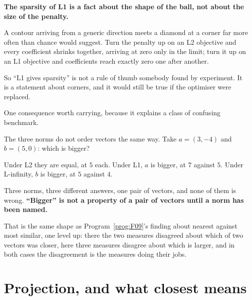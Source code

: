 \begin{fr}
\begin{trapbox}
\textbf{The sparsity of L1 is a fact about the shape of the ball, not about the
size of the penalty.}

A contour arriving from a generic direction meets a diamond at a corner far
more often than chance would suggest. Turn the penalty up on an L2 objective
and every coefficient shrinks together, arriving at zero only in the limit;
turn it up on an L1 objective and coefficients reach exactly zero one after
another.

So \enquote{L1 gives sparsity} is not a rule of thumb somebody found by
experiment. It is a statement about corners, and it would still be true if the
optimiser were replaced.
\end{trapbox}
\end{fr}

\begin{fr}
One consequence worth carrying, because it explains a class of confusing
benchmark.

The three norms do not order vectors the same way. Take $a = (3, -4)$ and
$b = (5, 0)$: which is bigger?
\dotline
\nextframe
\end{fr}

\begin{fr}
\begin{ansblock}
Under L2 they are equal, at $5$ each. Under L1, $a$ is bigger, at $7$ against
$5$. Under L-infinity, $b$ is bigger, at $5$ against $4$.
\end{ansblock}

Three norms, three different answers, one pair of vectors, and none of them is
wrong. \textbf{\enquote{Bigger} is not a property of a pair of vectors until a
norm has been named.}

That is the same shape as Program~\ref{prog:F09}'s finding about nearest
against most similar, one level up: there the two measures disagreed about
which of two vectors was closer, here three measures disagree about which is
larger, and in both cases the disagreement is the measures doing their jobs.
\end{fr}

\section{Projection, and what closest means}
\label{sec:P05-projection}

